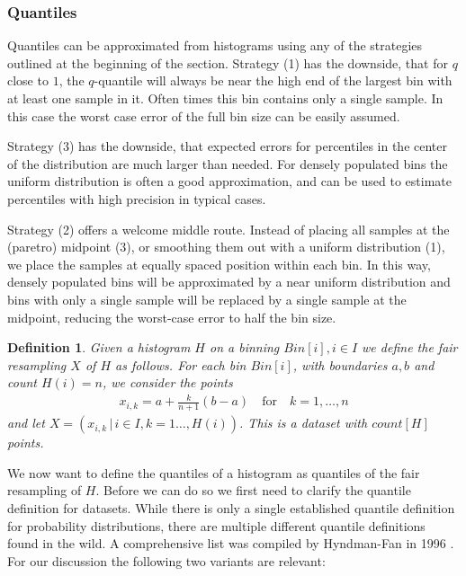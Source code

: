 \documentclass{article}
\theoremstyle{plain}
\newtheorem{definition}{Definition}[section]
\theoremstyle{remark}
\newcommand{\qtext}[1]{\quad\text{#1}\quad} %
\begin{document}
\subsubsection{Quantiles}

Quantiles can be approximated from histograms using any of the strategies outlined at the beginning
of the section.  Strategy (1) has the downside, that for $q$ close to $1$, the $q$-quantile will always
be near the high end of the largest bin with at least one sample in it. Often times this bin contains
only a single sample. In this case the worst case error of the full bin size can be easily assumed.

Strategy (3) has the downside, that expected errors for percentiles in the center of the distribution
are much larger than needed. For densely populated bins the uniform distribution is often a good
approximation, and can be used to estimate percentiles with high precision in typical cases.

Strategy (2) offers a welcome middle route. Instead of placing all samples at the (paretro) midpoint (3),
or smoothing them out with a uniform distribution (1), we place the samples at equally spaced position
within each bin. In this way, densely populated bins will be approximated by a near uniform distribution
and bins with only a single sample will be replaced by a single sample at the midpoint, reducing
the worst-case error to half the bin size.

\begin{definition}
  Given a histogram $H$ on a binning $Bin[i], i \in I$ we define the fair resampling $X$ of $H$ as follows.
  For each bin $Bin[i]$, with boundaries $a,b$ and count $H(i)=n$, we consider the points
  \begin{align*}
    x_{i,k} = a + \frac{k}{n+1} (b-a) \qtext{for} k=1,\dots,n
  \end{align*}
  and let $X = (x_{i,k} \,|\, i \in I, k = 1\dots,H(i))$. This is a dataset with $count[H]$ points.
\end{definition}

We now want to define the quantiles of a histogram as quantiles of the fair resampling of $H$.
Before we can do so we first need to clarify the quantile definition for datasets.
While there is only a single established quantile definition for probability distributions,
there are multiple different quantile definitions found in the wild.
A comprehensive list was compiled by Hyndman-Fan in 1996 \cite{HF1996}.
For our discussion the following two variants are relevant:
\end{document}
